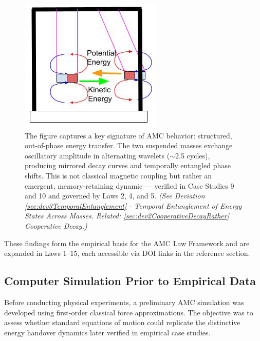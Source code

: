 \documentclass[10pt,aps,pre,onecolumn,superscriptaddress,notitlepage]{revtex4-2}
\begin{document}
\begin{figure}[htbp]
  \centering
  \begin{minipage}[c]{0.36\linewidth}
    \includegraphics[width=\linewidth]{figures/AK1_AMC_RMI_MOTION_KINETIC_RETURN.jpg}
  \end{minipage}%
  \hfill
  \begin{minipage}[c]{0.5\linewidth}
    \caption{The figure captures a key signature of AMC behavior: structured, out-of-phase energy transfer. The two suspended masses exchange oscillatory amplitude in alternating wavelets ($\sim$2.5 cycles), producing mirrored decay curves and temporally entangled phase shifts. This is not classical magnetic coupling but rather an emergent, memory-retaining dynamic — verified in Case Studies 9 and 10 and governed by Laws 2, 4, and 5. \textit{(See Deviation \ref{sec:dev3TemporalEntanglement} - Temporal Entanglement of Energy States Across Masses. Related: \ref{sec:dev2CooperativeDecayRather} Cooperative Decay.)}}
    \label{fig:amc_motion_kinetic_return}
  \end{minipage}
\end{figure}
These findings form the empirical basis for the AMC Law Framework and are expanded in Laws 1–15, each accessible via DOI links in the reference section.

\subsection{Computer Simulation Prior to Empirical Data}
Before conducting physical experiments, a preliminary AMC simulation was developed using first-order classical force approximations. The objective was to assess whether standard equations of motion could replicate the distinctive energy handover dynamics later verified in empirical case studies.
\end{document}
